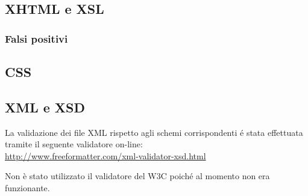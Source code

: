 \subsection{XHTML e XSL}
	\subsubsection {Falsi positivi}
\subsection{CSS}

\subsection{XML e XSD}
La validazione dei file XML rispetto agli schemi corrispondenti \'e stata effettuata tramite il seguente validatore on-line:
\\
\href{http://www.freeformatter.com/xml-validator-xsd.html}{http://www.freeformatter.com/xml-validator-xsd.html}

Non è stato utilizzato il validatore del W3C poich\'e al momento non era funzionante. 